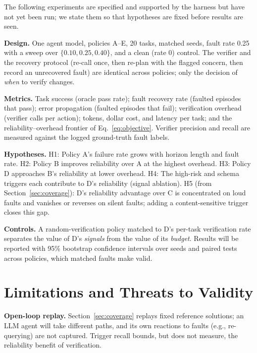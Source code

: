 \documentclass[conference]{IEEEtran}
\begin{document}
The following experiments are specified and supported by the harness but have not yet been
run; we state them so that hypotheses are fixed before results are seen.

\textbf{Design.} One agent model, policies A--E, 20 tasks, matched seeds, fault rate 0.25
with a sweep over $\{0.10, 0.25, 0.40\}$, and a clean (rate 0) control. The verifier and the
recovery protocol (re-call once, then re-plan with the flagged concern, then record an
unrecovered fault) are identical across policies; only the decision of \emph{when} to verify
changes.

\textbf{Metrics.} Task success (oracle pass rate); fault recovery rate (faulted episodes that
pass); error propagation (faulted episodes that fail); verification overhead (verifier calls per
action); tokens, dollar cost, and latency per task; and the reliability--overhead frontier of
Eq.~\eqref{eq:objective}. Verifier precision and recall are measured against the logged
ground-truth fault labels.

\textbf{Hypotheses.}
H1: Policy A's failure rate grows with horizon length and fault rate.
H2: Policy B improves reliability over A at the highest overhead.
H3: Policy D approaches B's reliability at lower overhead.
H4: The high-risk and schema triggers each contribute to D's reliability (signal ablation).
H5 (from Section~\ref{sec:coverage}): D's reliability advantage over C is concentrated on loud
faults and vanishes or reverses on silent faults; adding a content-sensitive trigger closes
this gap.

\textbf{Controls.} A random-verification policy matched to D's per-task verification rate
separates the value of D's \emph{signals} from the value of its \emph{budget}. Results will be
reported with 95\% bootstrap confidence intervals over seeds and paired tests across policies,
which matched faults make valid.

\section{Limitations and Threats to Validity}
\label{sec:limits}

\textbf{Open-loop replay.} Section~\ref{sec:coverage} replays fixed reference solutions; an LLM
agent will take different paths, and its own reactions to faults (e.g., re-querying) are not
captured. Trigger recall bounds, but does not measure, the reliability benefit of
verification.
\end{document}
